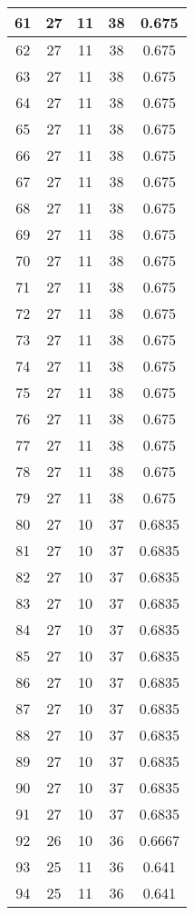 \documentclass[letterpaper, 12pt]{article}
\begin{document}
\begin{longtable}{|c|c|c|c|c|}
\hline
61 & 27 & 11 & 38 & 0.675 \\
\hline
62 & 27 & 11 & 38 & 0.675 \\
\hline
63 & 27 & 11 & 38 & 0.675 \\
\hline
64 & 27 & 11 & 38 & 0.675 \\
\hline
65 & 27 & 11 & 38 & 0.675 \\
\hline
66 & 27 & 11 & 38 & 0.675 \\
\hline
67 & 27 & 11 & 38 & 0.675 \\
\hline
68 & 27 & 11 & 38 & 0.675 \\
\hline
69 & 27 & 11 & 38 & 0.675 \\
\hline
70 & 27 & 11 & 38 & 0.675 \\
\hline
71 & 27 & 11 & 38 & 0.675 \\
\hline
72 & 27 & 11 & 38 & 0.675 \\
\hline
73 & 27 & 11 & 38 & 0.675 \\
\hline
74 & 27 & 11 & 38 & 0.675 \\
\hline
75 & 27 & 11 & 38 & 0.675 \\
\hline
76 & 27 & 11 & 38 & 0.675 \\
\hline
77 & 27 & 11 & 38 & 0.675 \\
\hline
78 & 27 & 11 & 38 & 0.675 \\
\hline
79 & 27 & 11 & 38 & 0.675 \\
\hline
80 & 27 & 10 & 37 & 0.6835 \\
\hline
81 & 27 & 10 & 37 & 0.6835 \\
\hline
82 & 27 & 10 & 37 & 0.6835 \\
\hline
83 & 27 & 10 & 37 & 0.6835 \\
\hline
84 & 27 & 10 & 37 & 0.6835 \\
\hline
85 & 27 & 10 & 37 & 0.6835 \\
\hline
86 & 27 & 10 & 37 & 0.6835 \\
\hline
87 & 27 & 10 & 37 & 0.6835 \\
\hline
88 & 27 & 10 & 37 & 0.6835 \\
\hline
89 & 27 & 10 & 37 & 0.6835 \\
\hline
90 & 27 & 10 & 37 & 0.6835 \\
\hline
91 & 27 & 10 & 37 & 0.6835 \\
\hline
92 & 26 & 10 & 36 & 0.6667 \\
\hline
93 & 25 & 11 & 36 & 0.641 \\
\hline
94 & 25 & 11 & 36 & 0.641 \\
\hline

\end{longtable}
\end{document}
